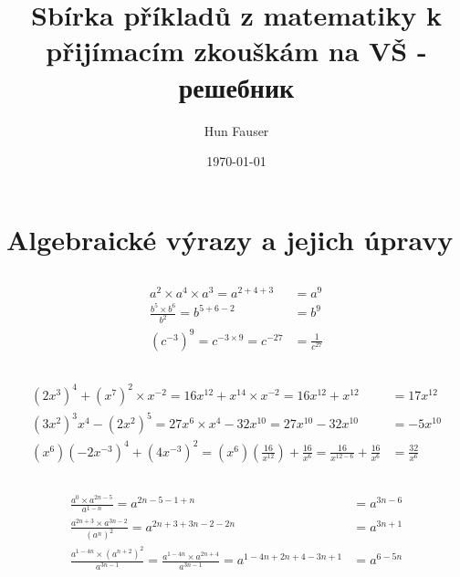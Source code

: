 \documentclass[a4paper,12pt]{article}
\author{Hun Fauser}
\title{Sbírka příkladů z matematiky k přijímacím zkouškám na VŠ - решебник}
\date{\today}
\begin{document}

\maketitle

\section{Algebraické výrazy a jejich úpravy}

\subsection{} %

\begin{align*}
a^2 \times a^4 \times a^3 
= a^{2 + 4 + 3} 
&= a^9 \\[6pt]
\frac{b^5 \times b^6}{b^2} 
= b^{5 + 6 - 2} 
&= b^9 \\[6pt]
(c^{-3})^9 
= c^{-3 \times 9} 
= c^{-27} 
&= \frac{1}{c^{27}}
\end{align*}

\subsection{} %

\begin{align*}
(2x^3)^4 + (x^7)^2 \times x^{-2} 
= 16x^{12} + x^{14} \times x^{-2} 
= 16x^{12} + x^{12} 
&= 17x^{12} \\[6pt]
(3x^2)^3 x^4 - (2x^2)^5 
= 27x^6 \times x^4 - 32x^{10} 
= 27x^{10} - 32 x^{10} 
&= -5x^{10} \\[6pt]
(x^6)(-2x^{-3})^4 + (4x^{-3})^2 
= (x^6) \left( \frac{16}{x^{12}} \right) + \frac{16}{x^6} 
= \frac{16}{x^{12 - 6}} + \frac{16}{x^6} 
&= \frac{32}{x^{6}}
\end{align*}

\subsection{} %

\begin{align*}
\frac{a^0 \times a^{2n - 5}}{a^{1 - n}} 
= a^{2n - 5 - 1 + n} 
&= a^{3n - 6} \\[6pt]
\frac{a^{2n + 3} \times a^{3n - 2}}{(a^n)^2} 
= a^{2n + 3 + 3n - 2 - 2n} 
&= a^{3n + 1} \\[6pt]
\frac{a^{1 - 4n} \times (a^{n + 2})^2}{a^{3n - 1}} 
= \frac{a^{1 - 4n} \times a^{2n + 4}}{a^{3n - 1}} 
= a^{1 - 4n + 2n + 4 - 3n + 1} 
&= a^{6 - 5n} 
\end{align*}
\end{document}
